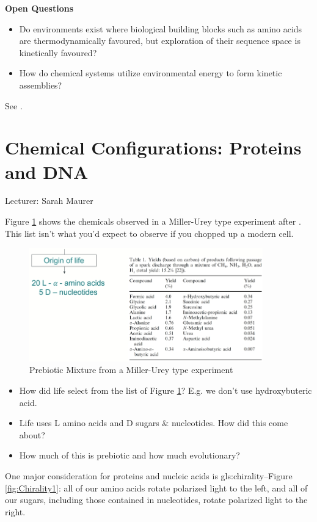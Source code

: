 \documentclass[]{article}
\begin{document}
\textbf{Open Questions}
\begin{itemize}
	\item Do environments exist where biological building blocks such as amino acids are
	thermodynamically favoured, but exploration of their sequence space is kinetically favoured?
	\item How do chemical systems utilize environmental energy to form kinetic assemblies?
\end{itemize}

See \cite{pross2017and,semenov2016autocatalytic,pross2008can,pross2005emergence}.

\section{Chemical Configurations: Proteins and DNA}

Lecturer: Sarah Maurer

Figure \ref{fig:PrebioticMix} shows the chemicals observed in a Miller-Urey type experiment after \cite{podlech2001origin}. This list isn't what you'd expect to observe if you chopped up a modern cell.
\begin{figure}[H]
	\caption{Prebiotic Mixture from a Miller-Urey type experiment} \label{fig:PrebioticMix} 
	\includegraphics[width=0.9\textwidth]{PrebioticMix}
\end{figure}

\begin{itemize}
	\item How did life select from the list of Figure \ref{fig:PrebioticMix}? E.g. we don't use hydroxybuteric acid.
	\item Life uses L amino acids and D sugars \& nucleotides. How did this come about?
	\item How much of this is prebiotic and how much evolutionary? 
\end{itemize}

One major consideration for proteins and nucleic acids is \gls{gls:chirality}--Figure \ref{fig:Chirality1}: all of our amino acids rotate polarized light to the left, and all of our sugars, including those contained in nucleotides, rotate polarized light  to the right. 
 
\end{document}
